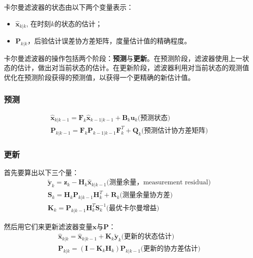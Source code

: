 卡尔曼滤波器的状态由以下两个变量表示：
\begin{itemize}
  \item $\hat{\bm{x}}_{k | k}$, 在时刻$k$的状态的估计；
  \item $\bm{P}_{k|k}$，后验估计误差协方差矩阵，度量估计值的精确程度。
\end{itemize}

卡尔曼滤波器的操作包括两个阶段：\textbf{预测}与\textbf{更新}。在预测阶段，滤波器使用上一状态的估计，做出对当前状态的估计。在更新阶段，滤波器利用对当前状态的观测值优化在预测阶段获得的预测值，以获得一个更精确的新估计值。
\subsubsection{预测}
\begin{equation}
  \begin{aligned}
    &\hat{\bm{x}}_{k|k-1}=\bm{F}_k \hat{\bm{x}}_{k-1 | k-1} + \bm{B}_k \bm{u}_{k} \text{(预测状态)} \\
    &\bm{P}_{k|k-1}=\bm{F}_k \bm{P}_{k-1|k-1} \bm{F}_k^T + \bm{Q}_k
    \text{(预测估计协方差矩阵)}
  \end{aligned}
\end{equation}

\subsubsection{更新}
首先要算出以下三个量：
\begin{equation}
  \begin{aligned}
    &\tilde{\bm{y}}_k = \bm{z}_k - \bm{H}_k \hat{\bm{x}}_{k|k-1}
     \text{(测量余量，measurement residual)} \\
    &\bm{S}_{k}=\bm{H}_k \bm{P}_{k|k-1} \bm{H}_k^T + \bm{R}_k
    \text{(测量余量协方差)} \\
    &\bm{K}_k = \bm{P}_{k|k-1} \bm{H}_k^T \bm{S}_{k}^{-1}
    \text{(最优卡尔曼增益)}
  \end{aligned}
\end{equation}

然后用它们来更新滤波器变量$\bm{x}$与$\bm{P}$：
\begin{equation}
  \begin{aligned}
    &\hat{\bm{x}}_{k|k} = \hat{\bm{x}}_{k|k-1} + \bm{K}_k \tilde{\bm{y}}_k
     \text{(更新的状态估计)} \\
    &\bm{P}_{k|k} =(\bm{I}-  \bm{K}_k \bm{H}_k) \bm{P}_{k|k-1}
    \text{(更新的协方差估计)}
  \end{aligned}
\end{equation}

